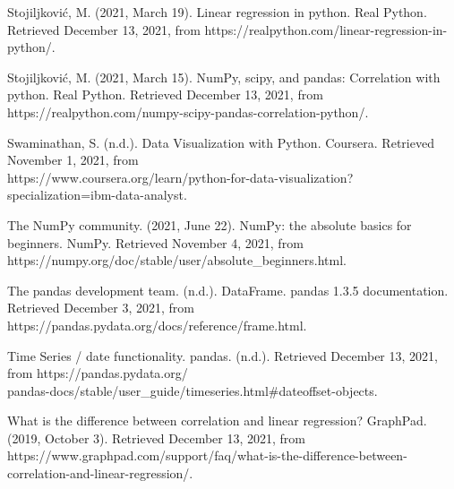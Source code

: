 \documentclass[fontsize=11pt]{article}
\begin{document}
\noindent
Stojiljković, M. (2021, March 19). Linear regression in python. Real Python. Retrieved December 13, 2021, from https://realpython.com/linear-regression-in-python/. 

\noindent
Stojiljković, M. (2021, March 15). NumPy, scipy, and pandas: Correlation with python. Real Python. Retrieved December 13, 2021, from https://realpython.com/numpy-scipy-pandas-correlation-python/. 


\noindent
Swaminathan, S. (n.d.). Data Visualization with Python. Coursera. Retrieved November 1, 2021, from\\
https://www.coursera.org/learn/python-for-data-visualization?specialization=ibm-data-analyst.

\noindent
The NumPy community. (2021, June 22). NumPy: the absolute basics for beginners. NumPy. Retrieved November 4, 2021, from https://numpy.org/doc/stable/user/absolute\_beginners.html.


\noindent
The pandas development team. (n.d.). DataFrame. pandas 1.3.5 documentation. Retrieved December 3, 2021, from https://pandas.pydata.org/docs/reference/frame.html. 


\noindent
Time Series / date functionality. pandas. (n.d.). Retrieved December 13, 2021, from https://pandas.pydata.org/ \\
pandas-docs/stable/user\_guide/timeseries.html\#dateoffset-objects.


\noindent
What is the difference between correlation and linear regression? GraphPad. (2019, October 3). Retrieved December 13, 2021, from https://www.graphpad.com/support/faq/what-is-the-difference-between-correlation-and-linear-regression/. 
\end{document}
